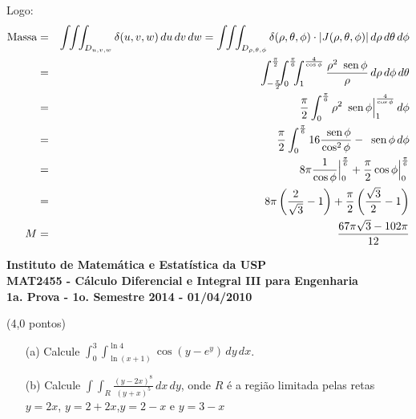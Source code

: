 \documentclass[12pt,a4paper]{article}
\newcommand{\sen}{\mbox{\, sen}\,}
\begin{document}
Logo:
\begin{eqnarray*}
\mbox{Massa} &=& \int\!\!\int\!\!\int_{D_{u,v,w}} \delta(u,v,w)\,du\,dv\,dw = \int\!\!\int\!\!\int_{D_{\rho,\theta,\phi}} \delta(\rho,\theta,\phi)\cdot |J(\rho,\theta,\phi)|\,d\rho\,d\theta\,d\phi\\
&=& \int_{-\frac{\pi}{2}}^{\frac{\pi}{2}}\!\!\!\int_{0}^{\frac{\pi}{6}}\!\!\!\int_1^{\frac{4}{\cos{\phi}}}\frac{\rho^2\sen{\phi}}{\rho}\,d\rho\,d\phi\,d\theta\\
&=& \frac{\pi}{2} \int_0^{\frac{\pi}{6}} \rho^2\sen{\phi}\Big|_1^{\frac{4}{\cos{\phi}}}\,d\phi\\
&=& \frac{\pi}{2} \int_0^{\frac{\pi}{6}} 16\frac{\sen{\phi}}{\cos^2{\phi}}-\sen{\phi}\,d\phi\\
&=& 8\pi \frac{1}{\cos{\phi}}\Big|_0^{\frac{\pi}{6}} + \frac{\pi}{2}\cos{\phi}\Big|_0^{\frac{\pi}{6}}\\
&=& 8\pi\left(\frac{2}{\sqrt{3}}-1\right) + \frac{\pi}{2}\left(\frac{\sqrt{3}}{2}-1\right)\\
M &=& \frac{67\pi \sqrt{3}-102 \pi}{12}
\end{eqnarray*}



\newpage
\begin{center}
\textbf{Instituto de Matemática e Estatística da USP\\
MAT2455 - Cálculo Diferencial e Integral III para Engenharia\\}
\textbf{1a. Prova - 1o. Semestre 2014 - 01/04/2010}
\end{center}


(4,0 pontos)
\begin{itemize}
	\item[(a)] Calcule $ \displaystyle{ \int_{0}^{3}  \int_{\ln{(x+1)}}^{\ln{4}} \cos{(y-e^y)}\,dy\, dx } $.
	
	\item[(b)] Calcule $\displaystyle{\int\!\!\!\int_R \frac{(y-2x)^8}{(y+x)^5}\,dx\,dy}$, onde $R$ é a região limitada pelas retas $y=2x$, $y=2+2x$,$y=2-x$ e $y=3-x$
	
\end{itemize}
\end{document}
